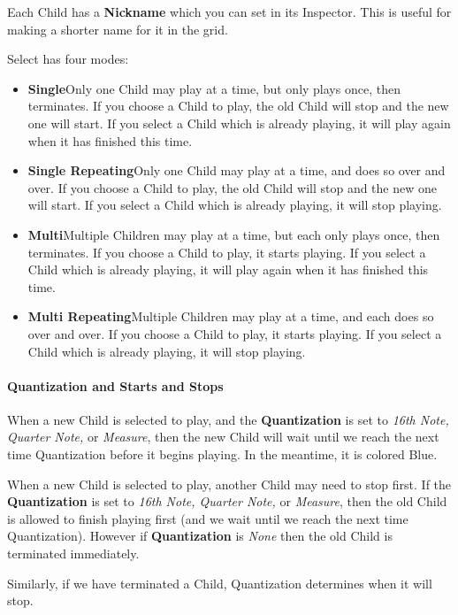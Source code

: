 \documentclass[twoside,10pt]{article}
\begin{document}
Each Child has a {\bf Nickname} which you can set in its Inspector.  This is useful for making a shorter name for it in the grid.



Select has four modes:

\begin{itemize}
\item{\bf Single}\quad Only one Child may play at a time, but only plays once, then terminates.  If you choose a Child to play, the old Child will stop and the new one will start.  If you select a Child which is already playing, it will play again when it has finished this time.
\item{\bf Single Repeating}\quad Only one Child may play at a time, and does so over and over.  If you choose a Child to play, the old Child will stop and the new one will start.  If you select a Child which is already playing, it will stop playing.
\item{\bf Multi}\quad Multiple Children may play at a time, but each only plays once, then terminates.  If you choose a Child to play, it starts playing.   If you select a Child which is already playing, it will play again when it has finished this time.
\item{\bf Multi Repeating}\quad Multiple Children may play at a time, and each does so over and over.  If you choose a Child to play, it starts playing.  If you select a Child which is already playing, it will stop playing.
\end{itemize}

\paragraph{Quantization and Starts and Stops}

When a new Child is selected to play, and the {\bf Quantization} is set to {\it 16th Note, Quarter Note,} or {\it Measure}, then the new Child will wait until we reach the next time Quantization before it begins playing.  In the meantime, it is colored Blue.

When a new Child is selected to play, another Child may need to stop first.   If the {\bf Quantization} is set to {\it 16th Note, Quarter Note,} or {\it Measure}, then the old Child is allowed to finish playing first (and we wait until we reach the next time Quantization).  However if {\bf Quantization} is {\it None} then the old Child is terminated immediately.

Similarly, if we have terminated a Child, Quantization determines when it will stop.
\end{document}
